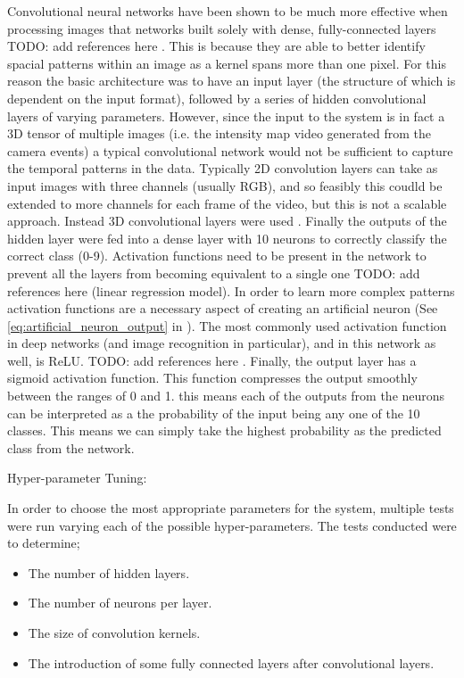 Convolutional neural networks have been shown to be much more effective when processing images that networks built solely with dense, fully-connected layers \color{red} TODO: add references here \color{black}. This is because they are able to better identify spacial patterns within an image as a kernel spans more than one pixel. For this reason the basic architecture was to have an input layer (the structure of which is dependent on the input format), followed by a series of hidden convolutional layers of varying parameters.
However, since the input to the system is in fact a 3D tensor of multiple images (i.e. the intensity map video generated from the camera events) a typical convolutional network would not be sufficient to capture the temporal patterns in the data. Typically 2D convolution layers can take as input images with three channels (usually RGB), and so feasibly this coudld be extended to more channels for each frame of the video, but this is not a scalable approach. Instead 3D convolutional layers were used \cite{3DConv}.
Finally the outputs of the hidden layer were fed into a dense layer with 10 neurons to correctly classify the correct class (0-9). Activation functions need to be present in the network to prevent all the layers from becoming equivalent to a single one \color{red} TODO: add references here \color{black} (linear regression model). In order to learn more complex patterns activation functions are a necessary aspect of creating an artificial neuron (See \autoref{eq:artificial_neuron_output} in ). The most commonly used activation function in deep networks (and image recognition in particular), and in this network as well, is ReLU. \color{red} TODO: add references here \color{black}. Finally, the output layer has a sigmoid activation function. This function compresses the output smoothly between the ranges of 0 and 1. this means each of the outputs from the neurons can be interpreted as a the probability of the input being any one of the 10 classes. This means we can simply take the highest probability as the predicted class from the network.

Hyper-parameter Tuning:

In order to choose the most appropriate parameters for the system, multiple tests were run varying each of the possible hyper-parameters. The tests conducted were to determine;

\begin{itemize}
    \item The number of hidden layers.
    \item The number of neurons per layer.
    \item The size of convolution kernels.
    \item The introduction of some fully connected layers after convolutional layers.
\end{itemize}


